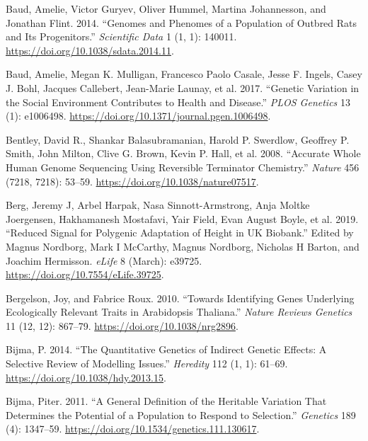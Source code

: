 \documentclass[
]{book}
\newlength{\cslhangindent}
\newlength{\cslentryspacingunit} %
\newenvironment{CSLReferences}[2] %
 {%
  \setlength{\parindent}{0pt}
  \ifodd #1
  \let\oldpar\par
  \def\par{\hangindent=\cslhangindent\oldpar}
  \fi
  \setlength{\parskip}{#2\cslentryspacingunit}
 }%
 {}
\begin{document}
\begin{CSLReferences}{1}{0}
\leavevmode{}%
Baud, Amelie, Victor Guryev, Oliver Hummel, Martina Johannesson, and Jonathan Flint. 2014. {``Genomes and Phenomes of a Population of Outbred Rats and Its Progenitors.''} \emph{Scientific Data} 1 (1, 1): 140011. \url{https://doi.org/10.1038/sdata.2014.11}.

\leavevmode{}%
Baud, Amelie, Megan K. Mulligan, Francesco Paolo Casale, Jesse F. Ingels, Casey J. Bohl, Jacques Callebert, Jean-Marie Launay, et al. 2017. {``Genetic {Variation} in the {Social Environment Contributes} to {Health} and {Disease}.''} \emph{PLOS Genetics} 13 (1): e1006498. \url{https://doi.org/10.1371/journal.pgen.1006498}.

\leavevmode{}%
Bentley, David R., Shankar Balasubramanian, Harold P. Swerdlow, Geoffrey P. Smith, John Milton, Clive G. Brown, Kevin P. Hall, et al. 2008. {``Accurate Whole Human Genome Sequencing Using Reversible Terminator Chemistry.''} \emph{Nature} 456 (7218, 7218): 53--59. \url{https://doi.org/10.1038/nature07517}.

\leavevmode{}%
Berg, Jeremy J, Arbel Harpak, Nasa Sinnott-Armstrong, Anja Moltke Joergensen, Hakhamanesh Mostafavi, Yair Field, Evan August Boyle, et al. 2019. {``Reduced Signal for Polygenic Adaptation of Height in {UK Biobank}.''} Edited by Magnus Nordborg, Mark I McCarthy, Magnus Nordborg, Nicholas H Barton, and Joachim Hermisson. \emph{eLife} 8 (March): e39725. \url{https://doi.org/10.7554/eLife.39725}.

\leavevmode{}%
Bergelson, Joy, and Fabrice Roux. 2010. {``Towards Identifying Genes Underlying Ecologically Relevant Traits in {Arabidopsis} Thaliana.''} \emph{Nature Reviews Genetics} 11 (12, 12): 867--79. \url{https://doi.org/10.1038/nrg2896}.

\leavevmode{}%
Bijma, P. 2014. {``The Quantitative Genetics of Indirect Genetic Effects: A Selective Review of Modelling Issues.''} \emph{Heredity} 112 (1, 1): 61--69. \url{https://doi.org/10.1038/hdy.2013.15}.

\leavevmode{}%
Bijma, Piter. 2011. {``A {General Definition} of the {Heritable Variation That Determines} the {Potential} of a {Population} to {Respond} to {Selection}.''} \emph{Genetics} 189 (4): 1347--59. \url{https://doi.org/10.1534/genetics.111.130617}.


\end{CSLReferences}
\end{document}
